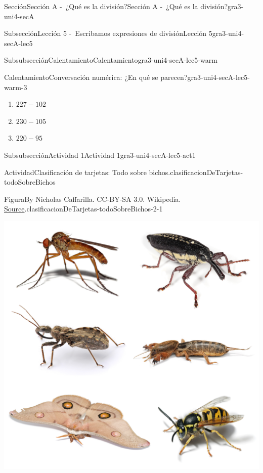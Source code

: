 \documentclass[twoside,10pt,]{article}
\begin{document}
\begin{sectionptx}{Sección}{Sección A -~¿Qué es la división?}{}{Sección A -~¿Qué es la división?}{}{}{gra3-uni4-secA}
\begin{subsectionptx}{Subsección}{Lección 5 -~Escribamos expresiones de división}{}{Lección 5}{}{}{gra3-uni4-secA-lec5}
\begin{subsubsectionptx}{Subsubsección}{Calentamiento}{}{Calentamiento}{}{}{gra3-uni4-secA-lec5-warm}
\begin{exploration}{Calentamiento}{Conversación numérica: ¿En qué se parecen?}{gra3-uni4-secA-lec5-warm-3}
\begin{enumerate}
\item{}\(\displaystyle 227 - 102\)%
\item{}\(\displaystyle 230 - 105\)%
\item{}\(\displaystyle 220 - 95\)%
\end{enumerate}
%
\end{exploration}%
\end{subsubsectionptx}
%
%
\typeout{************************************************}
\typeout{************************************************}
%
\begin{subsubsectionptx}{Subsubsección}{Actividad 1}{}{Actividad 1}{}{}{gra3-uni4-secA-lec5-act1}
\begin{activity}{Actividad}{Clasificación de tarjetas: Todo sobre bichos.}{clasificacionDeTarjetas-todoSobreBichos}%
\begin{figureptx}{Figura}{By Nicholas Caffarilla. CC-BY-SA 3.0. Wikipedia. \href{https://en.wikipedia.org/wiki/Insect\#/media/File:Insect_collage.png}{Source}\protect\footnotemark{}.}{clasificacionDeTarjetas-todoSobreBichos-2-1}{}%
\begin{image}{0.25}{0.5}{0.25}{}%
\includegraphics[width=\linewidth]{external/png-source/v1 3.4.A5 Launch.png}
\end{image}%
\tcblower
\end{figureptx}%
%
\begin{enumerate}

\end{enumerate}
\end{activity}
\end{subsubsectionptx}
\end{subsectionptx}
\end{sectionptx}
\end{document}
